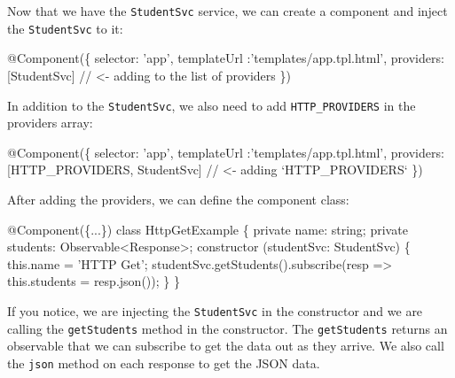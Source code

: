 \documentclass[12pt,]{article}
\newenvironment{Shaded}{}{}
\newcommand{\KeywordTok}[1]{\textcolor[rgb]{0.00,0.00,1.00}{{#1}}}
\newcommand{\CommentTok}[1]{\textcolor[rgb]{0.00,0.50,0.00}{{#1}}}
\newcommand{\FunctionTok}[1]{{#1}}
\newcommand{\NormalTok}[1]{{#1}}
\begin{document}
Now that we have the \texttt{StudentSvc} service, we can create a
component and inject the \texttt{StudentSvc} to it:

\begin{Shaded}
\begin{Highlighting}[numbers=left,,]
\FunctionTok{@Component}\NormalTok{(\{}
  \NormalTok{selector: 'app',}
  \NormalTok{templateUrl :'templates/app.}\FunctionTok{tpl}\NormalTok{.}\FunctionTok{html}\NormalTok{',}
  \NormalTok{providers: [StudentSvc] }\CommentTok{// <- adding to the list of providers}
\NormalTok{\})}
\end{Highlighting}
\end{Shaded}

In addition to the \texttt{StudentSvc}, we also need to add
\texttt{HTTP\_PROVIDERS} in the providers array:

\begin{Shaded}
\begin{Highlighting}[numbers=left,,]
\FunctionTok{@Component}\NormalTok{(\{}
  \NormalTok{selector: 'app',}
  \NormalTok{templateUrl :'templates/app.}\FunctionTok{tpl}\NormalTok{.}\FunctionTok{html}\NormalTok{',}
  \NormalTok{providers: [HTTP_PROVIDERS, StudentSvc] }\CommentTok{// <- adding `HTTP_PROVIDERS`}
\NormalTok{\})}
\end{Highlighting}
\end{Shaded}

After adding the providers, we can define the component class:

\begin{Shaded}
\begin{Highlighting}[numbers=left,,]
\FunctionTok{@Component}\NormalTok{(\{...\})}
\KeywordTok{class} \NormalTok{HttpGetExample  \{}
  \KeywordTok{private} \NormalTok{name: string;}
  \KeywordTok{private} \NormalTok{students: Observable<Response>;}
  \FunctionTok{constructor} \NormalTok{(studentSvc: StudentSvc) \{}
    \KeywordTok{this}\NormalTok{.}\FunctionTok{name} \NormalTok{= 'HTTP Get';}
    \NormalTok{studentSvc.}\FunctionTok{getStudents}\NormalTok{().}\FunctionTok{subscribe}\NormalTok{(resp => }\KeywordTok{this}\NormalTok{.}\FunctionTok{students} \NormalTok{= resp.}\FunctionTok{json}\NormalTok{());}
  \NormalTok{\}}
\NormalTok{\}}
\end{Highlighting}
\end{Shaded}

If you notice, we are injecting the \texttt{StudentSvc} in the
constructor and we are calling the \texttt{getStudents} method in the
constructor. The \texttt{getStudents} returns an observable that we can
subscribe to get the data out as they arrive. We also call the
\texttt{json} method on each response to get the JSON data.
\end{document}
